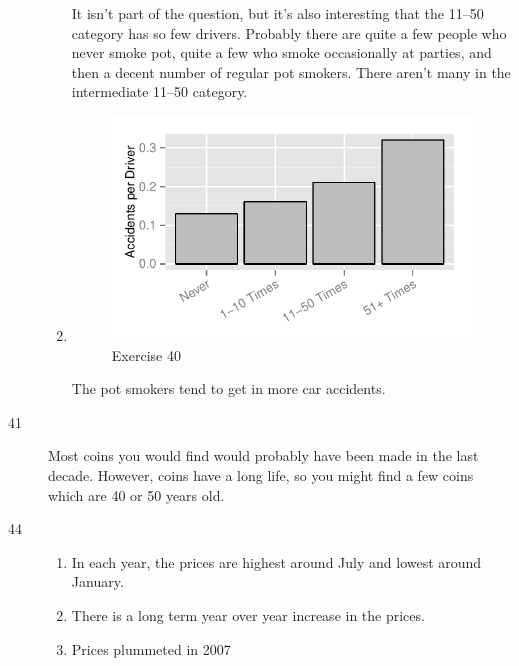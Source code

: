 \documentclass[letterpaper, landscape]{exam}
\begin{document}
\begin{description}
\begin{enumerate}[{a}]
          It isn't part of the question, but it's also interesting that the 11--50
          category has so few drivers.  Probably there are quite a few people who never
          smoke pot, quite a few who smoke occasionally at parties, and then a decent
          number of regular pot smokers.  There aren't many in the intermediate 11--50
          category.

          \item 
            \begin{figure}[H]
              \centering
              \includegraphics{figures/ex40.pdf}
              \caption{Exercise 40}
            \end{figure}

            The pot smokers tend to get in more car accidents.

        \end{enumerate}

      \item[41]
        Most coins you would find would probably have been made in the last
        decade.  However, coins have a long life, so you might find a few coins
        which are 40 or 50 years old.

      \item[44]
        \begin{enumerate}[{a}]
          \item In each year, the prices are highest around July and lowest around January.  
          
            \item There is a long term year over year increase in the prices.

            \item Prices plummeted in 2007


\end{enumerate}
\end{description}
\end{document}
